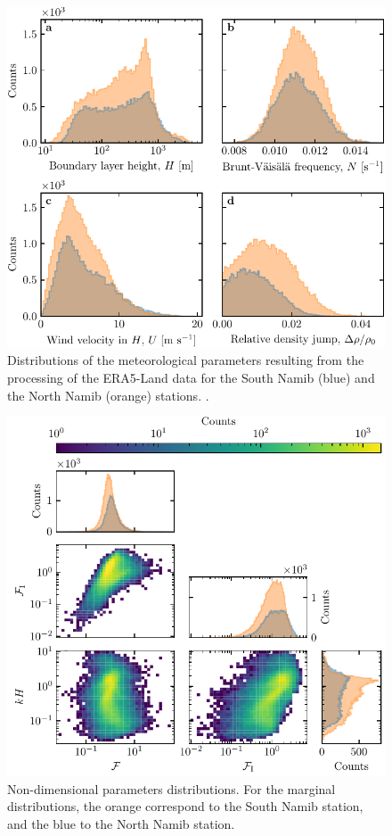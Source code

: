 \begin{figure}[p]
\centering
\includegraphics{Figures/Figure11_supp.pdf}
\caption{Distributions of the meteorological parameters resulting from the processing of the ERA5-Land data for the South Namib (blue) and the North Namib (orange) stations. . }
\label{Fig11_supp}
\end{figure}

\begin{figure}[p]
\centering
\includegraphics[scale=1]{Figures/Figure12_supp.pdf}
\caption{Non-dimensional parameters distributions. For the marginal  distributions, the orange correspond to the South Namib station, and the blue to the North Namib station.}
\label{Fig12_supp}
\end{figure}

